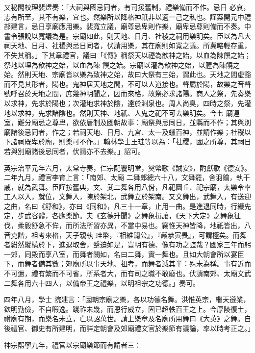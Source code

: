 \begin{pinyinscope}
 又秘閣校理裴煜奏：「大祠與國忌同者，有司援舊制，禮樂備而不作。忌日
 必哀，志有所至，其不有樂，宜也。然樂所以降格神祇非以適一己之私也。謹案開元中禮部建言，忌日享廟應用樂。裴寬立議，廟尊忌卑則作樂，廟卑忌尊則備而不奏。中書令張說以寬議為是。宗廟如此，則天地、日月、社稷之祠用樂明矣。臣以為凡大祠天地、日月、社稷與忌日同者，伏請用樂，其在廟則如寬之議。所冀略輕存重，不失其稱。」下其章禮官，議曰「《傳》稱祭天以禋為歆神之始，以血為陳饌之始；祭地以埋為歆神之始，以血為陳
 饌之始。宗廟以灌為歆神之始，以腥為陳饒之始。然則天地、宗廟皆以樂為致神之始，故曰大祭有三始，謂此也。天地之間虛豁而不見其形者，陽也。鬼神居天地之間，不可以人道接也。聲屬於陽，故樂之音聲號呼召於天地之間，庶幾神明聞之，因而來格，故祭必求諸陽。商人之祭，先奏樂以求神，先求於陽也；次灌地求神於陰，達於淵泉也。周人尚臭，四時之祭，先灌地以求神，先求諸陰也。然則天神、地祇、人鬼之祀不可去樂明矣。今七
 廟連室，難分廟忌之尊卑，欲依唐制及國朝故事：廟祭與忌同日，並縣而不作；其與別廟諸後忌同者，作之；若祠天地、日月、九宮、太一及蠟百神，並請作樂；社稷以下諸祠既卑於廟，則樂可不作。」翰林學士王珪等以為：「社稷，國之所尊，其祠日若與別廟諸後忌同者，伏請亦不去樂。」詔可。



 英宗治平元年六月，太常寺奏，仁宗配饗明堂，奠幣歌《誠安》，酌獻歌《德安》。二年九月，禮官李育上言：「南郊、太廟
 二舞郎總六十八，文舞罷，舍羽鑰，執干戚，就為武舞。臣謹按舊典，文、武二舞各用八佾，凡祀圜丘、祀宗廟，太樂令率工人以入，就位，文舞入，陳於架北，武舞立於架南。又文舞出，武舞入，有送迎之曲，名曰《舒和》，亦曰《同和》，凡三十一章，止用一曲。是進退同時，行綴先定，步武容體，各應樂節。夫《玄德升聞》之舞象揖讓，《天下大定》之舞象征伐，柔毅舒急不侔，而所法所習亦異，不當中易也。竊惟天神皆降，地祇皆出，八音克諧，祖考來格，天子親執
 珪幣，『相維闢公』，『嚴恭寅畏』，可謂極矣。而舞者紛然縱橫於下，進退取舍，蹙迫如是，豈明有德、像有功之誼哉？國家三年而躬一郊，同殿而享八室，而舞者闕如，名曰二舞，實一舞也。且如大朝會所以宴臣下，而舞者備其數；郊廟所以事天地、祖考，而舞者減其半：殊未為稱。事有近而不可邇，禮有繁而不可省，所系者大，而有司之職不敢廢也。伏請南郊、太廟文武二舞各用六十四人，以備帝王之禮樂，以明祖宗之功德。」奏可。



 四年八月，學士
 院建言：「國朝宗廟之樂，各以功德名舞。洪惟英宗，繼天遵業，欽明勤儉，不自暇逸。踐祚未幾，而恩行威立，固已超軼百王之上。今厚陵復土，祔廟有期，而樂名未立，亡以詔萬世。請上樂章及名廟所用舞曰《大英》之舞。自後禮官、御史有所建明，而詳定朝會及郊廟禮文官於樂節有議論，率以時考正之。」



 神宗熙寧九年，禮官以宗廟樂節而有請者三：




\end{pinyinscope}
